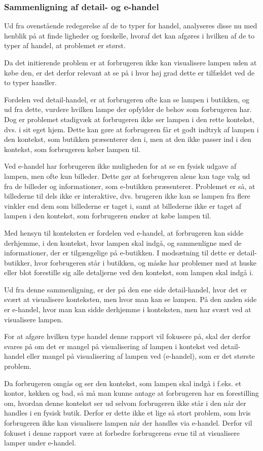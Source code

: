 \subsubsection{Sammenligning af detail- og e-handel}
Ud fra ovenstående redegørelse af de to typer for handel, analyseres disse nu med henblik på at finde ligheder og forskelle, hvoraf det kan afgøres i hvilken af de to typer af handel, at problemet er størst. 

Da det initierende problem er at forbrugeren ikke kan visualisere lampen uden at købe den, er det derfor relevant at se på i hvor høj grad dette er tilfældet ved de to typer handler.

Fordelen ved detail-handel, er at forbrugeren ofte kan se lampen i butikken, og ud fra dette, vurdere hvilken lampe der opfylder de behov som forbrugeren har. Dog er problemet stadigvæk at forbrugeren ikke ser lampen i den rette kontekst, dvs. i sit eget hjem. Dette kan gøre at forbrugeren får et godt indtryk af lampen i den kontekst, som butikken præsenterer den i, men at den ikke passer ind i den kontekst, som forbrugeren køber lampen til.

Ved e-handel har forbrugeren ikke muligheden for at se en fysisk udgave af lampen, men ofte kun billeder. Dette gør at forbrugeren alene kan tage valg ud fra de billeder og informationer, som e-butikken præsenterer. Problemet er så, at billederne til dels ikke er interaktive, dvs. brugeren ikke kan se lampen fra flere vinkler end dem som billederne er taget i, samt at billederne ikke er taget af lampen i den kontekst, som forbrugeren ønsker at købe lampen til. 

Med hensyn til konteksten er fordelen ved e-handel, at forbrugeren kan sidde derhjemme, i den kontekst, hvor lampen skal indgå, og sammenligne med de informationer, der er tilgængelige på e-butikken. I modsætning til dette er detail-butikker, hvor forbrugeren står i butikken, og måske har problemer med at huske eller blot forestille sig alle detaljerne ved den kontekst, som lampen skal indgå i.

Ud fra denne sammenligning, er der på den ene side detail-handel, hvor det er svært at visualisere konteksten, men hvor man kan se lampen. På den anden side er e-handel, hvor man kan sidde derhjemme i konteksten, men har svært ved at visualisere lampen. 

For at afgøre hvilken type handel denne rapport vil fokusere på, skal der derfor svares på om det er mangel på visualisering af lampen i kontekst ved detail-handel eller mangel på visualisering af lampen ved (e-handel), som er det største problem.

Da forbrugeren omgås og ser den kontekst, som lampen skal indgå i f.eks. et kontor, køkken og bad, så må man kunne antage at forbrugeren har en forestilling om, hvordan denne kontekst ser ud selvom forbrugeren ikke står i den når der handles i en fysisk butik. Derfor er dette ikke et lige så stort problem, som hvis forbrugeren ikke kan visualisere lampen når der handles via e-handel. Derfor vil fokuset i denne rapport være at forbedre forbrugerens evne til at visualisere lamper under e-handel.





